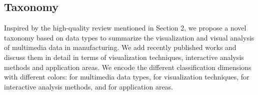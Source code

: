 \documentclass[a4paper,fleqn]{cas-dc}
\begin{document}
\subsection{Taxonomy}
Inspired by the high-quality review mentioned in Section 2, we propose a novel taxonomy based on data types to summarize the visualization and visual analysis of multimedia data in manufacturing.
We add recently published works and discuss them in detail in terms of visualization techniques, interactive analysis methods and application areas.
We encode the different classification dimensions with different colors:
 for multimedia data types, 
 for visualization techniques, 
 for interactive analysis methods, and 
 for application areas.
\end{document}
